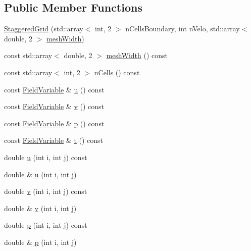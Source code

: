 \subsection*{Public Member Functions}
\begin{DoxyCompactItemize}
\item 
\mbox{\hyperlink{classStaggeredGrid_a12ac13158f4c9c267ca00c8f4af5e359}{Staggered\+Grid}} (std\+::array$<$ int, 2 $>$ n\+Cells\+Boundary, int n\+Velo, std\+::array$<$ double, 2 $>$ \mbox{\hyperlink{classStaggeredGrid_a330856d4efe952771daf0753ef84068e}{mesh\+Width}})
\item 
const std\+::array$<$ double, 2 $>$ \mbox{\hyperlink{classStaggeredGrid_a330856d4efe952771daf0753ef84068e}{mesh\+Width}} () const
\item 
const std\+::array$<$ int, 2 $>$ \mbox{\hyperlink{classStaggeredGrid_af37816ccb2c46e4a514dedac261897bf}{n\+Cells}} () const
\item 
const \mbox{\hyperlink{classFieldVariable}{Field\+Variable}} \& \mbox{\hyperlink{classStaggeredGrid_a87cee12621c641ab143a8b1a61b2ef7e}{u}} () const
\item 
const \mbox{\hyperlink{classFieldVariable}{Field\+Variable}} \& \mbox{\hyperlink{classStaggeredGrid_a26e478abba632554652c9e05a279d1ca}{v}} () const
\item 
const \mbox{\hyperlink{classFieldVariable}{Field\+Variable}} \& \mbox{\hyperlink{classStaggeredGrid_aafe6e0bb3509f6aad272b94f74e7ffec}{p}} () const
\item 
const \mbox{\hyperlink{classFieldVariable}{Field\+Variable}} \& \mbox{\hyperlink{classStaggeredGrid_a04ff9b2c14158e1f75860c8e4ef0a101}{t}} () const
\item 
double \mbox{\hyperlink{classStaggeredGrid_a0324ce4d1fe2343d8aa9514e460cc556}{u}} (int i, int j) const
\item 
double \& \mbox{\hyperlink{classStaggeredGrid_a0ed62d6752b6b2b3ead5f654b515cd12}{u}} (int i, int j)
\item 
double \mbox{\hyperlink{classStaggeredGrid_ac052d8803ff950aee04b86ac026c516b}{v}} (int i, int j) const
\item 
double \& \mbox{\hyperlink{classStaggeredGrid_a7746f703f32c2f20a4c77246eebac697}{v}} (int i, int j)
\item 
double \mbox{\hyperlink{classStaggeredGrid_aa6a5d99d9b4fbd9bd9cfa6ec071918f9}{p}} (int i, int j) const
\item 
double \& \mbox{\hyperlink{classStaggeredGrid_aa09a4ca67141589bae153797fbc4f3c5}{p}} (int i, int j)
\item 

\end{DoxyCompactItemize}

